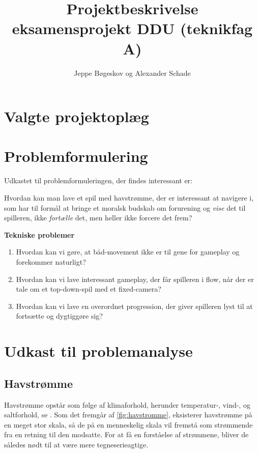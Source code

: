 \documentclass[12pt, a4paper]{article}
\title{
  Projektbeskrivelse\\
  {\large eksamensprojekt DDU (teknikfag A)}
}
\author{Jeppe Bøgeskov og Alexander Schade}
\begin{document}
\maketitle

\section*{Valgte projektoplæg}


\section*{Problemformulering}
Udkastet til problemformuleringen, der findes interessant er:
\begin{displayquote}
Hvordan kan man lave et spil med havstrømme, der er interessant at navigere i, som har til formål at bringe et moralsk budskab om forurening og \textit{vise} det til spilleren, ikke \textit{fortælle} det, men heller ikke forcere det frem?
\end{displayquote}

\textbf{Tekniske problemer}
\begin{enumerate}
  \item Hvordan kan vi gøre, at båd-movement ikke er til gene for gameplay og forekommer naturligt?
  \item Hvordan kan vi lave interessant gameplay, der får spilleren i flow, når der er tale om et top-down-spil med et fixed-camera?
  \item Hvordan kan vi lave en overordnet progression, der giver spilleren lyst til at fortsætte og dygtiggøre sig? 
\end{enumerate}
\newpage

\section*{Udkast til problemanalyse}
\subsection{Havstrømme}
Havstrømme opstår som følge af klimaforhold, herunder temperatur-, vind-, og saltforhold, se . Som det fremgår af \autoref{fig:havstromme}, eksisterer havstrømme på en meget stor skala, så de på en menneskelig skala vil fremstå som strømmende fra en retning til den modsatte. For at få en forståelse af strømmene, bliver de således nødt til at være mere tegneserieagtige.
\end{document}
